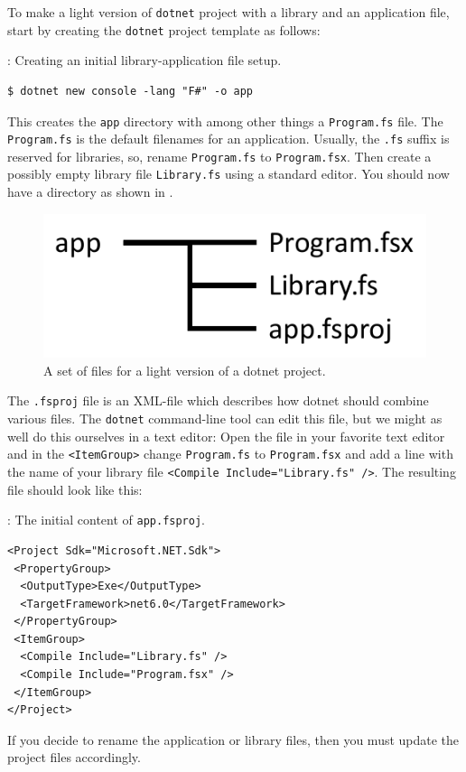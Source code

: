 \documentclass[fsharpNotes.tex]{subfiles}
\begin{document}
To make a light version of \lstinline[language=console]{dotnet} project with a library and an application file, start by creating the \lstinline[language=console]{dotnet} project template as follows:
\begin{codeNOutput}[label=dotnetNew,
  top=-5pt,
  bottom=-5pt,
  left=-2pt,
  right=-2pt,
]{: Creating an initial library-application file setup.}
  \begin{lstlisting}[language=console,escapechar=§]
$ dotnet new console -lang "F#" -o app
\end{lstlisting}%
\end{codeNOutput}
This creates the \lstinline[language=console]{app} directory with among other things a \lstinline[language=console]{Program.fs} file. The \lstinline[language=console]{Program.fs} is the default filenames for an application. Usually, the \lstinline[language=console]{.fs} suffix is reserved for libraries, so, rename \lstinline[language=console]{Program.fs} to \lstinline[language=console]{Program.fsx}. Then create a possibly empty library file \lstinline[language=console]{Library.fs} using a standard editor. You should now have a directory as shown in .
\begin{figure} %
  \centering
  \includegraphics[width=0.35\linewidth]{dotnetLightNew}
  \caption{A set of files for a light version of a dotnet project.}
  \label{fig:dotnetNewLightFileSystem}
\end{figure}
 The \lstinline[language=console]{.fsproj} file is an XML-file which describes how dotnet should combine various files. The \lstinline[language=console]{dotnet} command-line tool can edit this file, but we might as well do this ourselves in a text editor: Open the file in your favorite text editor and in the \lstinline[language=console]{<ItemGroup>} change \lstinline[language=console]{Program.fs} to \lstinline[language=console]{Program.fsx} and add a line with the name of your library file \lstinline[language=console]{<Compile Include="Library.fs" />}. The resulting file should look like this:
\begin{codeNOutput}[label=appLightFsproj,
  top=-5pt,
  bottom=-5pt,
  left=-2pt,
  right=-2pt,
]{: The initial content of \texttt{app.fsproj}.}
  \begin{lstlisting}[language=console,escapechar=§]
<Project Sdk="Microsoft.NET.Sdk">
 <PropertyGroup>
  <OutputType>Exe</OutputType>
  <TargetFramework>net6.0</TargetFramework>
 </PropertyGroup>
 <ItemGroup>
  <Compile Include="Library.fs" />
  <Compile Include="Program.fsx" />
 </ItemGroup>
</Project>
\end{lstlisting}
\end{codeNOutput}
If you decide to rename the application or library files, then you must update the project files accordingly.
\end{document}
